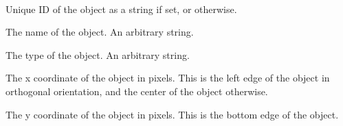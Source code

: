 \documentclass[letterpaper,10pt,english]{sphinxmanual}
\begin{document}

\begin{fulllineitems}
\label{index:tmx.Object}~

\begin{fulllineitems}
\label{index:tmx.Object.id}
Unique ID of the object as a string if set, or 
otherwise.

\end{fulllineitems}


\begin{fulllineitems}
\label{index:tmx.Object.name}
The name of the object.  An arbitrary string.

\end{fulllineitems}


\begin{fulllineitems}
\label{index:tmx.Object.type}
The type of the object.  An arbitrary string.

\end{fulllineitems}


\begin{fulllineitems}
\label{index:tmx.Object.x}
The x coordinate of the object in pixels.  This is the
left edge of the object in orthogonal orientation, and the center
of the object otherwise.

\end{fulllineitems}


\begin{fulllineitems}
\label{index:tmx.Object.y}
The y coordinate of the object in pixels.  This is the bottom
edge of the object.

\end{fulllineitems}


\end{fulllineitems}
\end{document}
